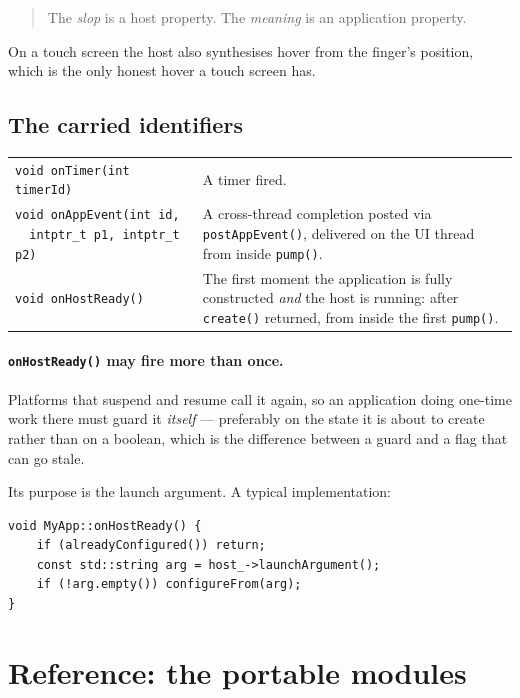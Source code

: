\documentclass[11pt,a4paper]{article}
\begin{document}
\begin{quote}
The \emph{slop} is a host property. The \emph{meaning} is an application
property.
\end{quote}

On a touch screen the host also synthesises hover from the finger's position,
which is the only honest hover a touch screen has.

\subsection{The carried identifiers}

\begin{longtable}{@{}p{}p{}@{}}
\toprule
\endhead
\texttt{void onTimer(int timerId)} &
A timer fired. \\
\addlinespace
\texttt{void onAppEvent(int id,} \newline \texttt{\ \ intptr\_t p1, intptr\_t
p2)} &
A cross-thread completion posted via \texttt{postAppEvent()}, delivered on the
UI thread from inside \texttt{pump()}. \\
\addlinespace
\texttt{void onHostReady()} &
The first moment the application is fully constructed \emph{and} the host is
running: after \texttt{create()} returned, from inside the first
\texttt{pump()}. \\
\bottomrule
\end{longtable}

\paragraph{\texttt{onHostReady()} may fire more than once.} Platforms that
suspend and resume call it again, so an application doing one-time work there
must guard it \emph{itself} --- preferably on the state it is about to create
rather than on a boolean, which is the difference between a guard and a flag
that can go stale.

Its purpose is the launch argument. A typical implementation:

\begin{lstlisting}
void MyApp::onHostReady() {
    if (alreadyConfigured()) return;
    const std::string arg = host_->launchArgument();
    if (!arg.empty()) configureFrom(arg);
}
\end{lstlisting}

\section{Reference: the portable modules}
\end{document}
